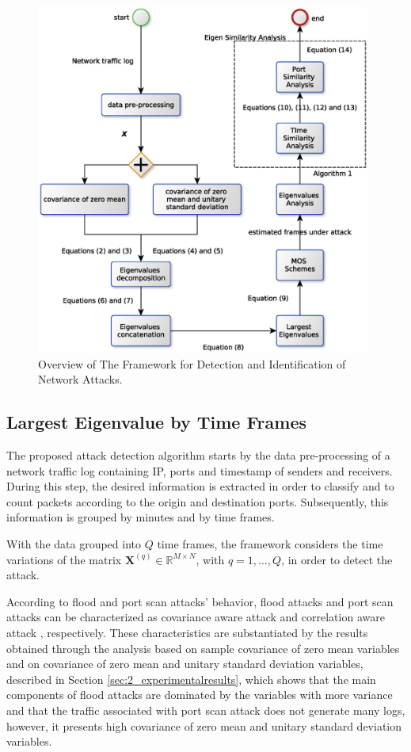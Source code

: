 \begin{figure}[h!]
	\centering
     \includegraphics[width=11cm]{figs/ch2/mos_eigen_similarity.eps}
     \caption{Overview of The Framework for Detection and Identification of Network Attacks.}
     \label{fig:2.08}
\end{figure}

\subsection{Largest Eigenvalue by Time Frames}
\label{sec:2_prop_LargestEigenvaluebyTimeFrames}

The proposed attack detection algorithm starts by the data pre-processing of a network traffic log containing IP, ports and timestamp of senders and receivers. During this step, the desired information is extracted in order to classify and to count packets according to the origin and destination ports. Subsequently, this information is grouped by minutes and by time frames.

With the data grouped into $Q$ time frames, the framework considers the time variations of the matrix $\pmb{X}^{(q)} \in \mathbb{R}^{M\times{N}}$, with $q = 1, \ldots, Q$, in order to detect the attack. 

According to flood and port scan attacks' behavior, flood attacks and port scan attacks can be characterized as covariance aware attack \citep{jin2004covariance} and correlation aware attack \citep{lakhina2005mining}, respectively. These characteristics are substantiated by the results obtained through the analysis based on sample covariance of zero mean variables and on covariance of zero mean and unitary standard deviation variables, described in Section \ref{sec:2_experimentalresults}, which shows that the main components of flood attacks are dominated by the variables with more variance and that the traffic associated with port scan attack does not generate many logs, however, it presents high covariance of zero mean and unitary standard deviation variables.

